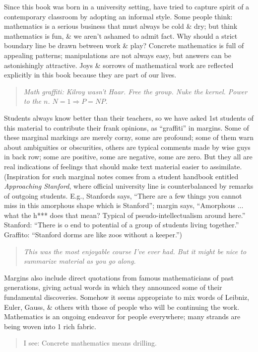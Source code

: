 \documentclass{article}
\begin{document}
\begin{enumerate}
	Since this book was born in a university setting, have tried to capture spirit of a contemporary classroom by adopting an informal style. Some people think: mathematics is a serious business that must always be cold \& dry; but think mathematics is fun, \& we aren't ashamed to admit fact. Why should a strict boundary line be drawn between work \& play? Concrete mathematics is full of appealing patterns; manipulations are not always easy, but answers can be astonishingly attractive. Joys \& sorrows of mathematical work are reflected explicitly in this book because they are part of our lives.
	\begin{quote}\it
		Math graffiti: Kilroy wasn't Haar. Free the group. Nuke the kernel. Power to the $n$. $N = 1\Rightarrow P = NP$.
	\end{quote}	
	Students always know better than their teachers, so we have asked 1st students of this material to contribute their frank opinions, as ``graffiti'' in margins. Some of these marginal markings are merely corny, some are profound; some of them warn about ambiguities or obscurities, others are typical comments made by wise guys in back row; some are positive, some are negative, some are zero. But they all are real indications of feelings that should make text material easier to assimilate. (Inspiration for such marginal notes comes from a student handbook entitled {\it Approaching Stanford}, where official university line is counterbalanced by remarks of outgoing students. E.g., Stanfords says, ``There are a few things you cannot miss in this amorphous shape which is Stanford''; margin says, ``Amorphous $\ldots$ what the h*** does that mean? Typical of pseudo-intellectualism around here.'' Stanford: ``There is o end to potential of a group of students living together.'' Graffito: ``Stanford dorms are like zoos without a keeper.'')
	\begin{quote}\it
		This was the most enjoyable course I've ever had. But it might be nice to summarize material as you go along.
	\end{quote}
	Margins also include direct quotations from famous mathematicians of past generations, giving actual words in which they announced some of their fundamental discoveries. Somehow it seems appropriate to mix words of {\sc Leibniz, Euler, Gauss}, \& others with those of people who will be continuing the work. Mathematics is an ongoing endeavor for people everywhere; many strands are being woven into 1 rich fabric.
	\begin{quote}
		I see: Concrete mathematics means drilling.
		

\end{quote}
\end{enumerate}
\end{document}

